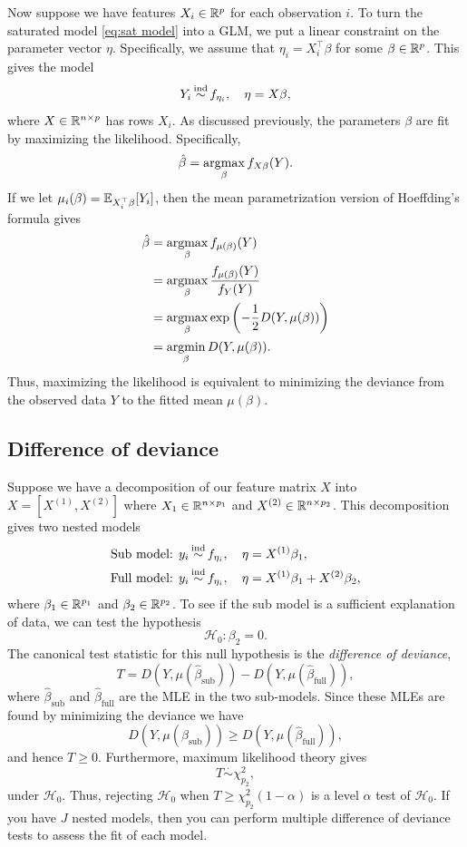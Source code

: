 Now suppose we have features $X_i \in \mathbb{R}^p$ for each observation $i$. To turn the saturated model \eqref{eq:sat model} into a GLM, we put a linear constraint on the parameter vector $\eta$. Specifically, we assume that $\eta_i = X_i^\top \beta$ for some $\beta \in \mathbb{R}^p$. This gives the model
\begin{equation}
        Y_i \simind f_{\eta_i}, \quad \eta = X\beta,
\end{equation}
where $X \in \mathbb{R}^{n \times p}$ has rows $X_i$. As discussed previously, the parameters $\beta$ are fit by maximizing the likelihood. Specifically,
\[\hat{\beta} = \operatorname*{argmax}_\beta f_{X\beta}(Y). \]
If we let $\mu_i(\beta) = {\mathbb E}_{X_i^\top \beta}[Y_i]$, then the mean parametrization version of Hoeffding's formula gives 
\begin{align*}
    \hat{\beta}&=\operatorname*{argmax}_\beta f_{\mu(\beta)}(Y)\\
    &= \operatorname*{argmax}_\beta \frac{f_{\mu(\beta)}(Y)}{f_Y(Y)}\\
    &=\operatorname*{argmax}_\beta \exp\left(-\frac{1}{2}D(Y,\mu(\beta))\right)\\
    &=\operatorname*{argmin}_\beta D(Y,\mu(\beta)).
\end{align*}
Thus, maximizing the likelihood is equivalent to minimizing the deviance from the observed data $Y$ to the fitted mean $\mu(\beta)$. 

\subsection{Difference of deviance}

Suppose we have a decomposition of our feature matrix $X$ into $X = [X^{(1)},X^{(2)}]$ where $X_1\in \mathbb{R}^{n\times p_1}$ and $X^{(2)} \in \mathbb{R}^{n \times p_2}$. This decomposition gives two nested models 
\begin{align*}
    \text{Sub model: } & y_i \simind f_{\eta_i},\quad \eta = X^{(1)}\beta_1,\\
    \text{Full model: } & y_i \simind f_{\eta_i},\quad \eta = X^{(1)}\beta_1+X^{(2)}\beta_2,
\end{align*}
where $\beta_1 \in \mathbb{R}^{p_1}$ and $\beta_2 \in \mathbb{R}^{p_2}$. To see if the sub model is a sufficient explanation of data, we can test the hypothesis
\[\mathcal{H}_0 : \beta_2 = 0.\]
The canonical test statistic for this null hypothesis is the \emph{difference of deviance},
\[T = D(Y, \mu(\hat{\beta}_{\text{sub}})) - D(Y,\mu(\hat{\beta}_{\text{full}})), \]
where $\hat{\beta}_{\text{sub}}$ and $\hat{\beta}_{\text{full}}$ are the MLE in the two sub-models. Since these MLEs are found by minimizing the deviance we have 
\[  D(Y, \mu(\hat{\beta}_{\text{sub}})) \ge D(Y,\mu(\hat{\beta}_{\text{full}})),\]
and hence $T \ge 0$. Furthermore, maximum likelihood theory gives 
\[T \stackrel{\cdot}{\sim} \chi^2_{p_2}, \]
under $\mathcal{H}_0$. Thus, rejecting $\mathcal{H}_0$ when $T \ge \chi^2_{p_2}(1-\alpha)$ is a level $\alpha$ test of $\mathcal{H}_0$. If you have $J$ nested models, then you can perform multiple difference of deviance tests to assess the fit of each model. 

